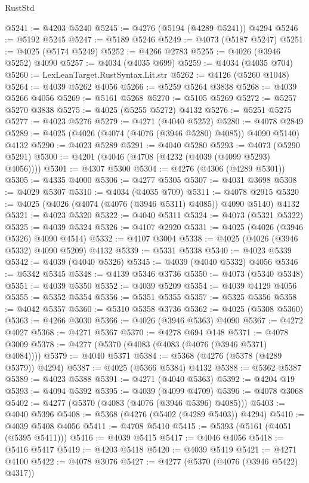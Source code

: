 \begin{lexlean}{RustStd}
\begin{coremodule}
@5241 := @4203 @5240
@5245 := @4276 (@5194 (@4289 @5241)) @4294
@5246 := @5192 @5245
@5247 := @5189 @5246
@5249 := @4073 (@5187 @5247)
@5251 := @4025 (@5174 @5249)
@5252 := @4266 @2783
@5255 := @4026 (@3946 @5252) @4090
@5257 := @4034 (@4035 @699)
@5259 := @4034 (@4035 @704)
@5260 := LexLeanTarget.RustSyntax.Lit.str
@5262 := @4126 (@5260 @1048)
@5264 := @4039 @5262 @4056
@5266 := @5259 @5264 @3838
@5268 := @4039 @5266 @4056
@5269 := @5161 @5268
@5270 := @5105 @5269
@5272 := @5257 @5270 @3838
@5275 := @4025 (@5255 @5272) @4132
@5276 := @5251 @5275
@5277 := @4023 @5276
@5279 := @4271 (@4040 @5252)
@5280 := @4078 @2849
@5289 := @4025 (@4026 (@4074 (@4076 (@3946 @5280) @4085)) @4090 @5140) @4132
@5290 := @4023 @5289
@5291 := @4040 @5280
@5293 := @4073 (@5290 @5291)
@5300 := @4201 (@4046 (@4708 (@4232 (@4039 (@4099 @5293) @4056))))
@5301 := @4307 @5300
@5304 := @4276 (@4306 (@4289 @5301))
@5305 := @4335 @4000
@5306 := @4277 @5305
@5307 := @4031 @3698
@5308 := @4029 @5307
@5310 := @4034 (@4035 @709)
@5311 := @4078 @2915
@5320 := @4025 (@4026 (@4074 (@4076 (@3946 @5311) @4085)) @4090 @5140) @4132
@5321 := @4023 @5320
@5322 := @4040 @5311
@5324 := @4073 (@5321 @5322)
@5325 := @4039 @5324
@5326 := @4107 @2920
@5331 := @4025 (@4026 (@3946 @5326) @4090 @4514)
@5332 := @4107 @3004
@5338 := @4025 (@4026 (@3946 @5332) @4090 @5209) @4132
@5339 := @5331 @5338
@5340 := @4023 @5339
@5342 := @4039 (@4040 @5326)
@5345 := @4039 (@4040 @5332) @4056
@5346 := @5342 @5345
@5348 := @4139 @5346 @3736
@5350 := @4073 (@5340 @5348)
@5351 := @4039 @5350
@5352 := @4039 @5209
@5354 := @4039 @4129 @4056
@5355 := @5352 @5354
@5356 := @5351 @5355
@5357 := @5325 @5356
@5358 := @4042 @5357
@5360 := @5310 @5358 @3736
@5362 := @4025 (@5308 @5360)
@5363 := @4266 @3030
@5366 := @4026 (@3946 @5363) @4090
@5367 := @4272 @4027
@5368 := @4271 @5367
@5370 := @4278 @694 @148
@5371 := @4078 @3009
@5378 := @4277 (@5370 (@4083 (@4083 (@4076 (@3946 @5371) @4084))))
@5379 := @4040 @5371
@5384 := @5368 (@4276 (@5378 (@4289 @5379)) @4294)
@5387 := @4025 (@5366 @5384) @4132
@5388 := @5362 @5387
@5389 := @4023 @5388
@5391 := @4271 (@4040 @5363)
@5392 := @4204 @19
@5393 := @4094 @5392
@5395 := @4039 (@4099 @4709)
@5396 := @4078 @3068
@5402 := @4277 (@5370 (@4083 (@4076 (@3946 @5396) @4085)))
@5403 := @4040 @5396
@5408 := @5368 (@4276 (@5402 (@4289 @5403)) @4294)
@5410 := @4039 @5408 @4056
@5411 := @4708 @5410
@5415 := @5393 (@5161 (@4051 (@5395 @5411)))
@5416 := @4039 @5415
@5417 := @4046 @4056
@5418 := @5416 @5417
@5419 := @4203 @5418
@5420 := @4039 @5419
@5421 := @4271 @4100
@5422 := @4078 @3076
@5427 := @4277 (@5370 (@4076 (@3946 @5422) @4317))

\end{coremodule}
\end{lexlean}
